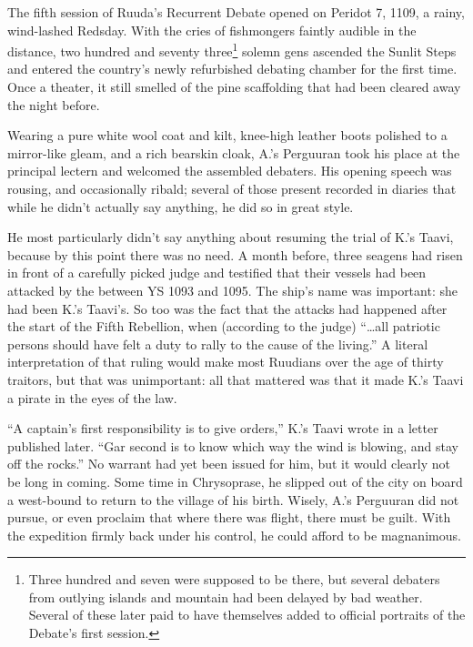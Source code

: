 \documentclass[12pt]{report}
\begin{document}
The fifth session of Ruuda's Recurrent Debate opened on Peridot 7,
1109, a rainy, wind-lashed Redsday.  With the cries of fishmongers
faintly audible in the distance, two hundred and seventy
three\footnote{Three hundred and seven were supposed to be there, but
several debaters from outlying islands and mountain 
had been delayed by bad weather.  Several of these later paid to have
themselves added to official portraits of the Debate's first session.}
solemn gens ascended the Sunlit Steps and entered the country's newly
refurbished debating chamber for the first time.  Once a theater, it
still smelled of the pine scaffolding that had been cleared away the
night before.

Wearing a pure white wool coat and kilt, knee-high leather boots
polished to a mirror-like gleam, and a rich bearskin cloak, A.'s
Perguuran took his place at the principal lectern and welcomed the
assembled debaters.  His opening speech was rousing, and occasionally
ribald; several of those present recorded in diaries that while he
didn't actually say anything, he did so in great style.

He most particularly didn't say anything about resuming the trial of
K.'s Taavi, because by this point there was no need.  A month before,
three seagens had risen in front of a carefully picked judge and
testified that their vessels had been attacked by the  between YS 1093 and 1095.  The ship's name was important: she had
been K.'s Taavi's.  So too was the fact that the attacks had happened
after the start of the Fifth Rebellion, when (according to the judge)
``{\ldots}all patriotic persons should have felt a duty to rally to the
cause of the living.''  A literal interpretation of that ruling would
make most Ruudians over the age of thirty traitors, but that was
unimportant: all that mattered was that it made K.'s Taavi a pirate in
the eyes of the law.

``A captain's first responsibility is to give orders,'' K.'s Taavi wrote
in a letter published later.  ``Gar second is to know which way the
wind is blowing, and stay off the rocks.''  No warrant had yet been
issued for him, but it would clearly not be long in coming.  Some time
in Chrysoprase, he slipped out of the city on board a west-bound
 to return to the village of his birth.  Wisely, A.'s
Perguuran did not pursue, or even proclaim that where there was
flight, there must be guilt.  With the expedition firmly back under
his control, he could afford to be magnanimous.
\end{document}

